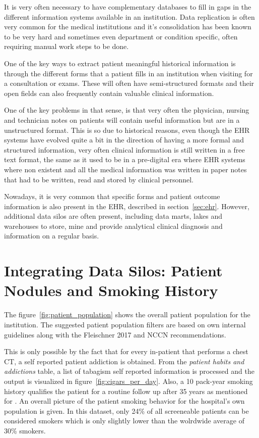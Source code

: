 It is very often necessary to have complementary databases to fill in gaps in the different information systems available in an institution. Data replication is often very common for the medical institutions and it's consolidation has been known to be very hard and sometimes even department or condition specific, often requiring manual work steps to be done.

One of the key ways to extract patient meaningful historical information is through the different forms that a patient fills in an institution when visiting for a consultation or exams. These will often have semi-structured formats and their open fields can also frequently contain valuable clinical information. 

One of the key problems in that sense, is that very often the physician, nursing and technician notes on patients will contain useful information but are in a unstructured format. This is so due to historical reasons, even though the EHR systems have evolved quite a bit in the direction of having a more formal and structured information, very often clinical information is still written in a free text format, the same as it used to be in a pre-digital era where EHR systems where non existent and all the medical information was written in paper notes that had to be written, read and stored by clinical personnel.

Nowadays, it is very common that specific forms and patient outcome information is also present in the EHR, described in section~\ref{sec:ehr}. However, additional data silos are often present, including data marts, lakes and warehouses to store, mine and provide analytical clinical diagnosis and information on a regular basis.

\section{Integrating Data Silos: Patient Nodules and Smoking History}

The figure~\ref{fig:patient_population} shows the overall patient population for the institution. The suggested patient population filters are based on \nomeHslShort{} own internal guidelines along with the Fleischner 2017 and NCCN recommendations.

This is only possible by the fact that for every in-patient that performs a chest CT, a self reported patient addiction is obtained. From the \emph{patient habits and addictions} table, a list of tabagism self reported information is processed and the output is visualized in figure~\ref{fig:cigars_per_day}.
Also, a 10 pack-year smoking history qualifies the patient for a routine follow up after 35 years as mentioned for \nomeHslShort{}. An overall picture of the patient smoking behavior for the hospital's own population is given. In this dataset, only 24\% of all screeneable patients can be considered smokers which is only slightly lower than the wolrdwide average of 30\% smokers.

